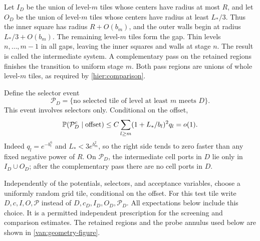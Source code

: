 Let $I_D$ be the union of level-$m$ tiles whose centers have radius at
most $R$, and let $O_D$ be the union of level-$m$ tiles whose centers
have radius at least $L_*/3$. Thus the inner square has radius
$R+O(b_m)$, and the outer walls begin at radius $L_*/3+O(b_m)$. The
remaining level-$m$ tiles form the gap. Thin levels $n,\ldots,m-1$ in
all gaps, leaving the inner squares and walls at stage $n$. The result
is called the intermediate system. A complementary pass on the retained
regions finishes the transition to uniform stage $m$. Both pass regions
are unions of whole level-$m$ tiles, as required by
\cref{hier:comparison}.

Define the selector event
\begin{equation}\label{van:no-large}
 \mathcal P_D
 =\{\text{no selected tile of level at least $m$ meets $D$}\}.
\end{equation}
This event involves selectors only. Conditional on the offset,
\begin{equation}\label{van:no-large-bound}
 \mathbb P(\mathcal P_D^c\mid\text{offset})
 \leq C\sum_{l\geq m}(1+L_*/b_l)^2q_l=o(1).
\end{equation}
Indeed $q_l=e^{-b_l^6}$ and $L_*<3e^{b_m^2}$, so the right side tends
to zero faster than any fixed negative power of $R$. On $\mathcal P_D$,
the intermediate cell ports in $D$ lie only in $I_D\cup O_D$; after the
complementary pass there are no cell ports in $D$.

Independently of the potentials, selectors, and acceptance variables,
choose a uniformly random grid tile, conditional on the offset. For
this test tile write $D,c,I,O,\mathcal P$ instead of
$D,c_D,I_D,O_D,\mathcal P_D$. All expectations below include this
choice. It is a permitted independent prescription for the screening
and comparison estimates.
The retained regions and the probe annulus used below are shown in
\cref{van:geometry-figure}.

